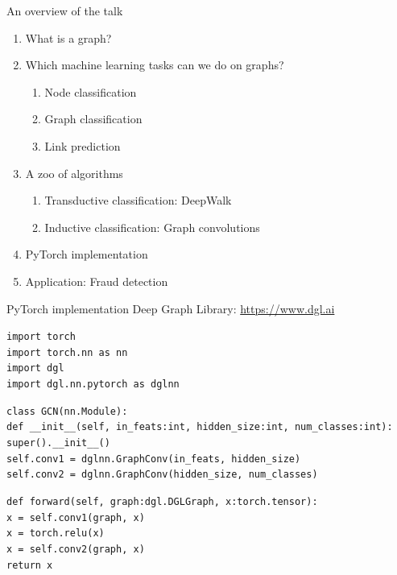 \documentclass{beamer}
\begin{document}
\begin{frame}{An overview of the talk}
  \begin{enumerate}
    \item What is a graph?
    \item Which machine learning tasks can we do on graphs?
      \begin{enumerate}
        \item Node classification
        \item Graph classification
        \item Link prediction
      \end{enumerate}
    \item A zoo of algorithms
      \begin{enumerate}
        \item Transductive classification: DeepWalk
        \item Inductive classification: Graph convolutions
      \end{enumerate}
    \item<alert@1> PyTorch implementation
    \item Application: Fraud detection
  \end{enumerate}
\end{frame}

\begin{frame}{PyTorch implementation}
  Deep Graph Library: {\footnotesize\url{https://www.dgl.ai}}

  \pause\scriptsize
  \tt{import torch}\\
  \tt{import torch.nn as nn}\\
  \alert<3>{\tt{import dgl}}\\
  \alert<3>{\tt{import dgl.nn.pytorch as dglnn}}

  \tt{class GCN(nn.Module):}\\
  \qquad\tt{def \_\_init\_\_(self, in\_feats:int, hidden\_size:int,
  num\_classes:int):}\\
  \qquad\qquad\tt{super().\_\_init\_\_()}\\
  \qquad\qquad\tt{self.conv1 = 
  \alert<3>{dglnn.GraphConv(in\_feats, hidden\_size)}}\\
  \qquad\qquad\tt{self.conv2 = 
  \alert<3>{dglnn.GraphConv(hidden\_size, num\_classes)}}

  \qquad\tt{def forward(self, \alert<4>{graph:dgl.DGLGraph}, 
  x:torch.tensor):}\\
  \qquad\qquad\tt{x = self.conv1(\alert<4>{graph}, x)}\\
  \qquad\qquad\tt{x = torch.relu(x)}\\
  \qquad\qquad\tt{x = self.conv2(\alert<4>{graph}, x)}\\
  \qquad\qquad\tt{return x}
\end{frame}
\end{document}
